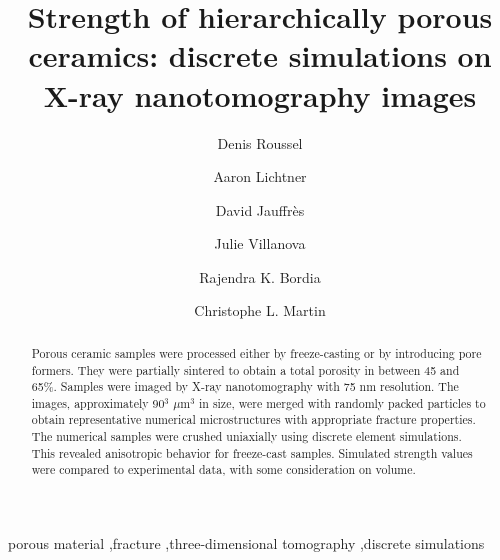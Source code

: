 \documentclass[preprint,12pt,3p]{elsarticle}
\begin{document}
\begin{frontmatter}

\title{Strength of hierarchically porous ceramics: discrete simulations on X-ray nanotomography images}


%
%
%
%

\author[label1]{Denis Roussel}

\author[label2]{Aaron Lichtner}

\author[label1]{David Jauffr\`{e}s}
\author[label3]{Julie Villanova}

\author[label2]{Rajendra K. Bordia}

\author[label1]{Christophe L. Martin}
\address[label1]{Univ. Grenoble Alpes, CNRS, SIMAP, F-38000 Grenoble, France}
\address[label2]{Department of Materials Science and Engineering, University of Washington, Roberts Hall, Box 352120, Seattle, WA 98195, United States}
\address[label3]{ESRF – The European Synchrotron, CS 40220,
38043 Grenoble Cedex 9, France}
\begin{abstract}
Porous ceramic samples were processed either by freeze-casting or by introducing pore formers. They were partially sintered to obtain a total porosity in between 45 and 65\%. Samples were imaged by X-ray nanotomography with 75 nm resolution. The images, approximately 90$^3$ $\mu$m$^3$ in size, were merged with randomly packed particles to obtain representative numerical microstructures with appropriate fracture properties. The numerical samples were crushed uniaxially using discrete element simulations. This revealed anisotropic behavior for freeze-cast samples. Simulated strength values were compared to experimental data, with some consideration on volume.  
\end{abstract}

\begin{keyword}
porous material \sep fracture \sep three-dimensional tomography \sep discrete simulations
\end{keyword}

\end{frontmatter}
\end{document}
